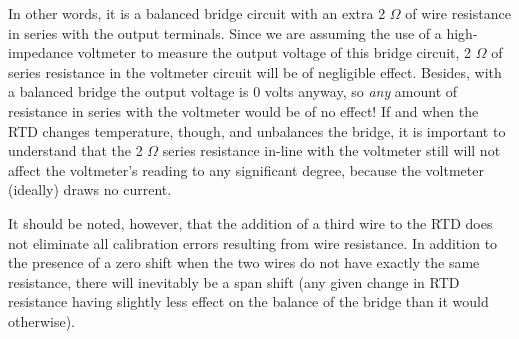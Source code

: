In other words, it is a balanced bridge circuit with an extra 2 $\Omega$ of wire resistance in series with the output terminals.  Since we are assuming the use of a high-impedance voltmeter to measure the output voltage of this bridge circuit, 2 $\Omega$ of series resistance in the voltmeter circuit will be of negligible effect.  Besides, with a balanced bridge the output voltage is 0 volts anyway, so {\it any} amount of resistance in series with the voltmeter would be of no effect!  If and when the RTD changes temperature, though, and unbalances the bridge, it is important to understand that the 2 $\Omega$ series resistance in-line with the voltmeter still will not affect the voltmeter's reading to any significant degree, because the voltmeter (ideally) draws no current.

\vskip 10pt

It should be noted, however, that the addition of a third wire to the RTD does not eliminate all calibration errors resulting from wire resistance.  In addition to the presence of a zero shift when the two wires do not have exactly the same resistance, there will inevitably be a span shift (any given change in RTD resistance having slightly less effect on the balance of the bridge than it would otherwise).





